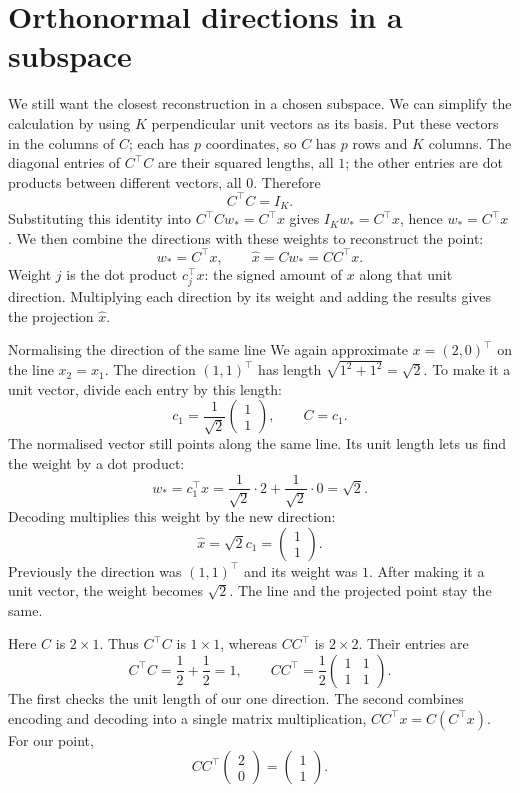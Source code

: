 \documentclass[a4paper,12pt,oneside]{report}
\begin{document}
\clearpage
\section{Orthonormal directions in a subspace}

We still want the closest reconstruction in a chosen subspace. We can
simplify the calculation by using $K$ perpendicular unit vectors as
its basis. Put these vectors in the columns of $C$; each has $p$
coordinates, so $C$ has $p$ rows and $K$ columns.
The diagonal entries of $C^\top C$ are their squared lengths, all $1$;
the other entries are dot products between different vectors, all $0$.
Therefore
\[
  C^\top C=I_K.
\]
Substituting this identity into $C^\top Cw_*=C^\top x$ gives
$I_Kw_*=C^\top x$, hence $w_*=C^\top x$. We then combine the
directions with these weights to reconstruct the point:
\[
  \boxed{w_*=C^\top x,\qquad \hat{x}=Cw_*=CC^\top x.}
\]
Weight $j$ is the dot product $c_j^\top x$: the signed amount of $x$
along that unit direction. Multiplying each direction by its weight
and adding the results gives the projection $\hat{x}$.

\begin{framedexample}{Normalising the direction of the same line}
We again approximate $x=(2,0)^\top$ on the line $x_2=x_1$.
The direction $(1,1)^\top$ has length $\sqrt{1^2+1^2}=\sqrt{2}$.
To make it a unit vector, divide each entry by this length:
\[
  c_1=\frac{1}{\sqrt{2}}\begin{pmatrix}1\\1\end{pmatrix},
  \qquad C=c_1.
\]
The normalised vector still points along the same line. Its unit
length lets us find the weight by a dot product:
\[
  w_*=c_1^\top x=\frac{1}{\sqrt{2}}\cdot2
                   +\frac{1}{\sqrt{2}}\cdot0=\sqrt{2}.
\]
Decoding multiplies this weight by the new direction:
\[
  \hat{x}=\sqrt{2}c_1=\begin{pmatrix}1\\1\end{pmatrix}.
\]
Previously the direction was $(1,1)^\top$ and its weight was $1$.
After making it a unit vector, the weight becomes $\sqrt{2}$.
The line and the projected point stay the same.

Here $C$ is $2\times1$. Thus $C^\top C$ is $1\times1$, whereas
$CC^\top$ is $2\times2$. Their entries are
\[
  C^\top C=\frac{1}{2}+\frac{1}{2}=1,\qquad
  CC^\top=\frac{1}{2}\begin{pmatrix}1&1\\1&1\end{pmatrix}.
\]
The first checks the unit length of our one direction. The second
combines encoding and decoding into a single matrix multiplication,
$CC^\top x=C(C^\top x)$. For our point,
\[
  CC^\top\begin{pmatrix}2\\0\end{pmatrix}
   =\begin{pmatrix}1\\1\end{pmatrix}.
\]
\end{framedexample}
\end{document}
